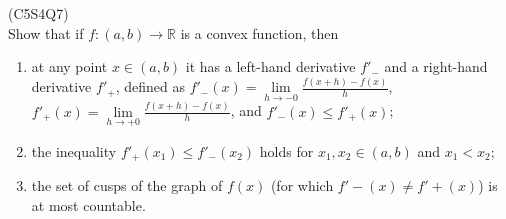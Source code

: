\begin{prb}
    (C5S4Q7) \\
    Show that if $f : (a, b)\rightarrow \mathbb{R}$ is a convex function, then
    \begin{enumerate}
        \item[a)] at any point $x \in (a, b)$ it has a left-hand derivative $f'_-$ and a right-hand derivative $f'_+$, defined as $f'_-(x) = 
        \lim\limits_{h \to -0} \frac{f(x + h) - f(x)}{h}$, $f'_+(x) = \lim\limits_{h \to +0} \frac{f(x + h) - f(x)}{h}$, and $f'_-(x) \leq f'_+(x)$;
        \item[b)] the inequality $f'_+(x_1) \leq f'_-(x_2)$ holds for $x_1, x_2 \in (a, b)$ and $x_1 < x_2$;
        \item[c)] the set of cusps of the graph of $f(x)$ (for which $f'-(x) \neq f'+(x)$) is at most countable.
    \end{enumerate}
\end{prb}
\newline\newline

